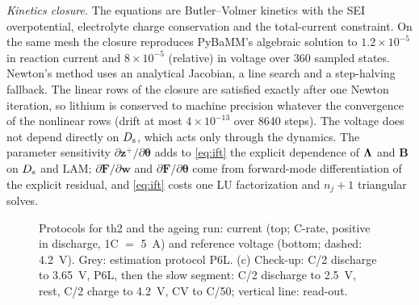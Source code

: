 \documentclass[journal]{IEEEtran}
\newcommand{\vz}{\bm{z}}\newcommand{\vj}{\bm{j}}\newcommand{\vy}{\bm{y}}\newcommand{\vw}{\bm{w}}
\newcommand{\vth}{\bm{\theta}}\newcommand{\vF}{\bm{F}}\newcommand{\mA}{\bm{A}}\newcommand{\mB}{\bm{B}}
\newcommand{\LAM}{\mathrm{LAM}}\newcommand{\LLI}{\mathrm{LLI}}\newcommand{\phipl}{\phi_{\mathrm{pl}}}
\begin{document}
\emph{Kinetics closure.} The equations are Butler--Volmer kinetics with the SEI overpotential, electrolyte charge conservation and the total-current constraint. On the same mesh the closure reproduces PyBaMM's algebraic solution to $1.2\times10^{-5}$ in reaction current and $8\times10^{-5}$ (relative) in voltage over 360 sampled states. Newton's method uses an analytical Jacobian, a line search and a step-halving fallback. The linear rows of the closure are satisfied exactly after one Newton iteration, so lithium is conserved to machine precision whatever the convergence of the nonlinear rows (drift at most $4\times10^{-13}$ over 8640 steps). The voltage does not depend directly on $D_{\mathrm{s}}$, which acts only through the dynamics. The parameter sensitivity $\partial\vz^{+}/\partial\vth$ adds to \eqref{eq:ift} the explicit dependence of $\bm{\Lambda}$ and $\mB$ on $D_{\mathrm{s}}$ and $\LAM$; $\partial\vF/\partial\vw$ and $\partial\vF/\partial\vth$ come from forward-mode differentiation of the explicit residual, and \eqref{eq:ift} costs one LU factorization and $n_j+1$ triangular solves.

\begin{figure}[t]
\centering

\caption{Protocols for th2 and the ageing run: current (top; C-rate, positive in discharge, 1C $=$ \SI{5}{\ampere}) and reference voltage (bottom; dashed: \SI{4.2}{\volt}). Grey: estimation protocol P6L. (c) Check-up: C/2 discharge to \SI{3.65}{\volt}, P6L, then the slow segment: C/2 discharge to \SI{2.5}{\volt}, rest, C/2 charge to \SI{4.2}{\volt}, CV to C/50; vertical line: read-out.}
\label{fig:protocols}
\end{figure}
\end{document}
